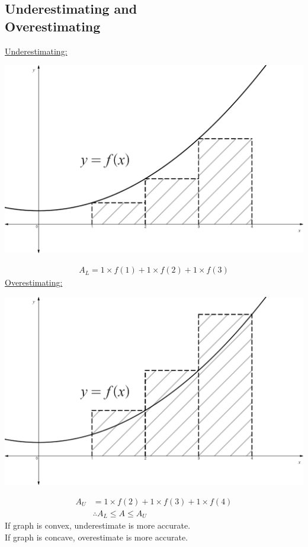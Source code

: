 \documentclass[10pt, a4paper, titlepage]{article}
\begin{document}
\begin{multicols*}{3}
\subsection{Underestimating and \\Overestimating}
\underline{Underestimating:}\\
\begin{center}
	\includegraphics[width=0.9\linewidth]{underestimate.png}\\
\end{center}
\begin{align}
	A_L=1\times f(1)+1\times f(2)+1\times f(3)
\end{align}
\underline{Overestimating:}\\
\begin{center}
	\includegraphics[width=0.9\linewidth]{overestimate.png}\\
\end{center}
\begin{align}
	A_U&=1\times f(2)+1\times f(3)+1\times f(4)\\
	&\therefore A_L\leq A\leq A_U
\end{align}
If graph is convex, underestimate is more accurate.\\
If graph is concave, overestimate is more accurate.\\


\end{multicols*}
\end{document}
